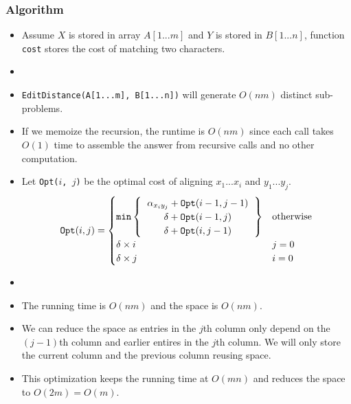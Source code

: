 \subsubsection{Algorithm}
\begin{itemize}
    \item Assume $X$ is stored in array $A[1...m]$ and $Y$ is stored in $B[1...n]$, function \texttt{cost} stores the cost of matching two characters.
    \item[] 
    \item \texttt{EditDistance(A[1...m], B[1...n])} will generate $O(nm)$ distinct sub-problems.
    \item If we memoize the recursion, the runtime is $O(nm)$ since each call takes $O(1)$ time to assemble the answer from recursive calls and no other computation.
    \item Let \texttt{Opt($i$, $j$)} be the optimal cost of aligning $x_1...x_i$ and $y_1...y_j$.
    \begin{equation}
        \texttt{Opt}(i, j) = \begin{cases}
            \texttt{min} \left\{
                \begin{tabular}{c}
                    $\alpha_{x_iy_j} + \texttt{Opt}(i - 1, j - 1)$ \\
                    $\delta + \texttt{Opt}(i - 1, j)$ \\
                    $\delta + \texttt{Opt}(i, j - 1)$ \\
                \end{tabular}
            \right\} & \text{otherwise} \\
            \delta \times i & j = 0 \\
            \delta \times j & i = 0 \\
        \end{cases}
    \end{equation}
    \item[] 
    \item The running time is $O(nm)$ and the space is $O(nm)$.
    \item We can reduce the space as entries in the $j$th column only depend on the $(j - 1)$th column and earlier entires in the $j$th column. We will only store the current column and the previous column reusing space.
    \item This optimization keeps the running time at $O(mn)$ and reduces the space to $O(2m) = O(m)$.
\end{itemize}
